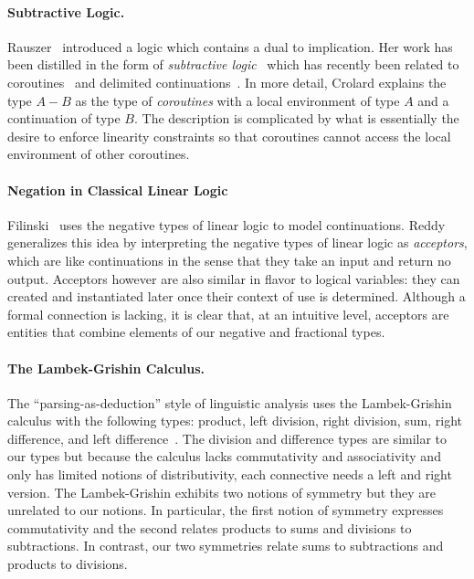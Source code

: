 \documentclass[preprint]{sigplanconf}
\begin{document}
\paragraph*{Subtractive Logic.} 
Rauszer~\cite{springerlink:10.1007/BF02120864,rauszer,rauszer2} introduced a
logic which contains a dual to implication. Her work has been distilled in
the form of \emph{subtractive logic}~\cite{Crolard01} which has recently been
related to coroutines~\cite{Crolard01082004} and delimited
continuations~\cite{Ariola:2009:TFD:1743339.1743381}.  In more detail,
Crolard explains the type $A-B$ as the type of \emph{coroutines} with a local
environment of type $A$ and a continuation of type $B$. The description is
complicated by what is essentially the desire to enforce linearity
constraints so that coroutines cannot access the local environment of other
coroutines. 

\paragraph*{Negation in Classical Linear Logic} 
Filinski~\cite{Filinski92} uses the negative types of linear logic to model
continuations. Reddy~\cite{Reddy91} generalizes this idea by interpreting the
negative types of linear logic as \emph{acceptors}, which are like
continuations in the sense that they take an input and return no
output. Acceptors however are also similar in flavor to logical variables:
they can created and instantiated later once their context of use is
determined. Although a formal connection is lacking, it is clear that, at an
intuitive level, acceptors are entities that combine elements of our negative
and fractional types.

\paragraph*{The Lambek-Grishin Calculus.} The ``parsing-as-deduction'' style
of linguistic analysis uses the Lambek-Grishin calculus with the following
types: product, left division, right division, sum, right difference, and
left difference~\cite{Bernardi:2010:CSL:1749618.1749689}. The division and
difference types are similar to our types but because the calculus lacks
commutativity and associativity and only has limited notions of
distributivity, each connective needs a left and right version. The
Lambek-Grishin exhibits two notions of symmetry but they are unrelated to our
notions. In particular, the first notion of symmetry expresses commutativity
and the second relates products to sums and divisions to subtractions. In
contrast, our two symmetries relate sums to subtractions and products to
divisions.
\end{document}
